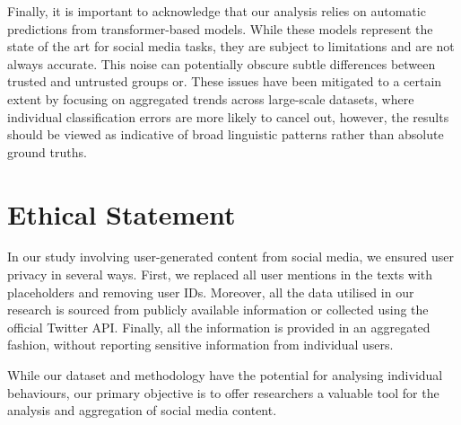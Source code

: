 Finally, it is important to acknowledge that our analysis relies on automatic predictions from transformer-based models. While these models represent the state of the art for social media tasks, they are subject to limitations and are not always accurate. This noise can potentially obscure subtle differences between trusted and untrusted groups or. These issues have been mitigated to a certain extent by focusing on aggregated trends across large-scale datasets, where individual classification errors are more likely to cancel out, however, the results should be viewed as indicative of broad linguistic patterns rather than absolute ground truths.

\section{Ethical Statement}
\label{sec:ethics}
In our study involving user-generated content from social media, we ensured user privacy in several ways. First, we replaced all user mentions in the texts with placeholders and removing user IDs. Moreover, all the data utilised in our research is sourced from publicly available information or collected using the official Twitter API. Finally, all the information is provided in an aggregated fashion, without reporting sensitive information from individual users.

While our dataset and methodology have the potential for analysing individual behaviours, our primary objective is to offer researchers a valuable tool for the analysis and aggregation of social media content.



